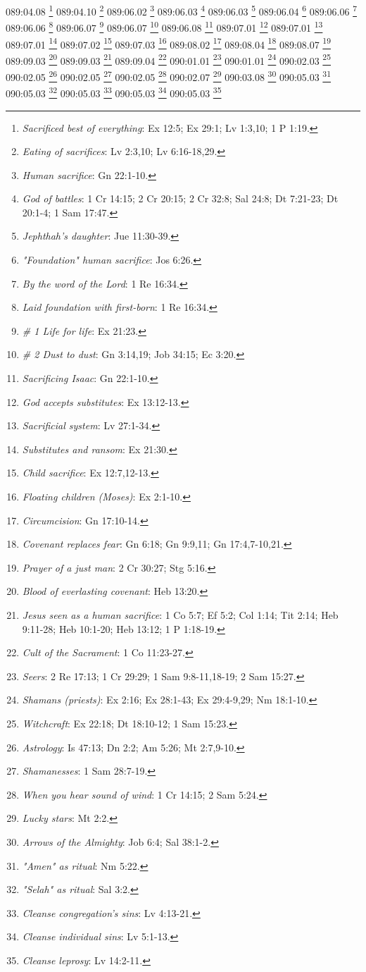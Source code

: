 089:04.08 \footnote{\textit{Sacrificed best of everything}: Ex 12:5; Ex 29:1; Lv 1:3,10; 1 P 1:19.}
089:04.10 \footnote{\textit{Eating of sacrifices}: Lv 2:3,10; Lv 6:16-18,29.}
089:06.02 \footnote{\textit{Human sacrifice}: Gn 22:1-10.}
089:06.03 \footnote{\textit{God of battles}: 1 Cr 14:15; 2 Cr 20:15; 2 Cr 32:8; Sal 24:8; Dt 7:21-23; Dt 20:1-4; 1 Sam 17:47.}
089:06.03 \footnote{\textit{Jephthah's daughter}: Jue 11:30-39.}
089:06.04 \footnote{\textit{"Foundation" human sacrifice}: Jos 6:26.}
089:06.06 \footnote{\textit{By the word of the Lord}: 1 Re 16:34.}
089:06.06 \footnote{\textit{Laid foundation with first-born}: 1 Re 16:34.}
089:06.07 \footnote{\textit{# 1 Life for life}: Ex 21:23.}
089:06.07 \footnote{\textit{# 2 Dust to dust}: Gn 3:14,19; Job 34:15; Ec 3:20.}
089:06.08 \footnote{\textit{Sacrificing Isaac}: Gn 22:1-10.}
089:07.01 \footnote{\textit{God accepts substitutes}: Ex 13:12-13.}
089:07.01 \footnote{\textit{Sacrificial system}: Lv 27:1-34.}
089:07.01 \footnote{\textit{Substitutes and ransom}: Ex 21:30.}
089:07.02 \footnote{\textit{Child sacrifice}: Ex 12:7,12-13.}
089:07.03 \footnote{\textit{Floating children (Moses)}: Ex 2:1-10.}
089:08.02 \footnote{\textit{Circumcision}: Gn 17:10-14.}
089:08.04 \footnote{\textit{Covenant replaces fear}: Gn 6:18; Gn 9:9,11; Gn 17:4,7-10,21.}
089:08.07 \footnote{\textit{Prayer of a just man}: 2 Cr 30:27; Stg 5:16.}
089:09.03 \footnote{\textit{Blood of everlasting covenant}: Heb 13:20.}
089:09.03 \footnote{\textit{Jesus seen as a human sacrifice}: 1 Co 5:7; Ef 5:2; Col 1:14; Tit 2:14; Heb 9:11-28; Heb 10:1-20; Heb 13:12; 1 P 1:18-19.}
089:09.04 \footnote{\textit{Cult of the Sacrament}: 1 Co 11:23-27.}
090:01.01 \footnote{\textit{Seers}: 2 Re 17:13; 1 Cr 29:29; 1 Sam 9:8-11,18-19; 2 Sam 15:27.}
090:01.01 \footnote{\textit{Shamans (priests)}: Ex 2:16; Ex 28:1-43; Ex 29:4-9,29; Nm 18:1-10.}
090:02.03 \footnote{\textit{Witchcraft}: Ex 22:18; Dt 18:10-12; 1 Sam 15:23.}
090:02.05 \footnote{\textit{Astrology}: Is 47:13; Dn 2:2; Am 5:26; Mt 2:7,9-10.}
090:02.05 \footnote{\textit{Shamanesses}: 1 Sam 28:7-19.}
090:02.05 \footnote{\textit{When you hear sound of wind}: 1 Cr 14:15; 2 Sam 5:24.}
090:02.07 \footnote{\textit{Lucky stars}: Mt 2:2.}
090:03.08 \footnote{\textit{Arrows of the Almighty}: Job 6:4; Sal 38:1-2.}
090:05.03 \footnote{\textit{"Amen" as ritual}: Nm 5:22.}
090:05.03 \footnote{\textit{"Selah" as ritual}: Sal 3:2.}
090:05.03 \footnote{\textit{Cleanse congregation's sins}: Lv 4:13-21.}
090:05.03 \footnote{\textit{Cleanse individual sins}: Lv 5:1-13.}
090:05.03 \footnote{\textit{Cleanse leprosy}: Lv 14:2-11.}
